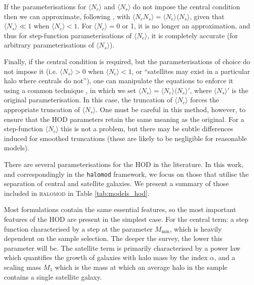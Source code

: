 \documentclass[5p,aas_macros]{elsarticle}
\newcommand{\Nc}{\langle N_c \rangle}
\newcommand{\Ns}{\langle N_s \rangle}
\begin{document}
If the parameterisations for $\Nc$ and $\Ns$ do not impose the central condition then we can approximate, following \citet{Zehavi2005}, with $\langle N_c N_s \rangle = \Nc \Ns$, given that $\Ns \ll 1$ when $\Nc < 1$. For $\Nc = 0$ or 1, it is no longer an approximation, and thus for step-function parameterisations of $\Nc$, it is completely accurate (for arbitrary parameterisations of $\Ns$).

Finally, if the central condition is required, but the parameterisations of choice do not impose it (i.e. $\Ns > 0$ when $\Nc<1$, or ``satellites may exist in a particular halo where centrals do not''), one can manipulate the equations to enforce it using a common technique \citep[eg.][]{Beutler2013}, in which we set $\Ns = \Nc \Ns'$, where $\Ns'$ is the original parameterisation. In this case, the truncation of $\Nc$ forces the appropriate truncation of $\Ns$. One must be careful in this method, however,  to ensure that the HOD parameters retain the same meaning as the original. For a step-function $\Nc$ this is not a problem, but there may be subtle differences induced for smoothed truncations (these are likely to be negligible for reasonable models).

There are several parameterisations for the HOD in the literature. In this work, and correspondingly in the \verb|halomod| framework, we focus on those that utilise the separation of
central and satellite galaxies. We present a summary of those included in \textsc{halomod} in Table \ref{tab:models_hod}. 

 Most formulations contain the same essential features, so the most important features of the HOD are present in the simplest case. For the central term: a step function characterised by a step at the parameter $M_\text{min}$, which is heavily dependent on the sample selection. The deeper the survey, the lower this parameter will be. The satellite term is primarily characterised by a power law which quantifies the growth of galaxies with halo mass by the index $\alpha$, and a scaling mass $M_1$ which is the mass at which an average halo in the sample contains a single satellite galaxy.
\end{document}
